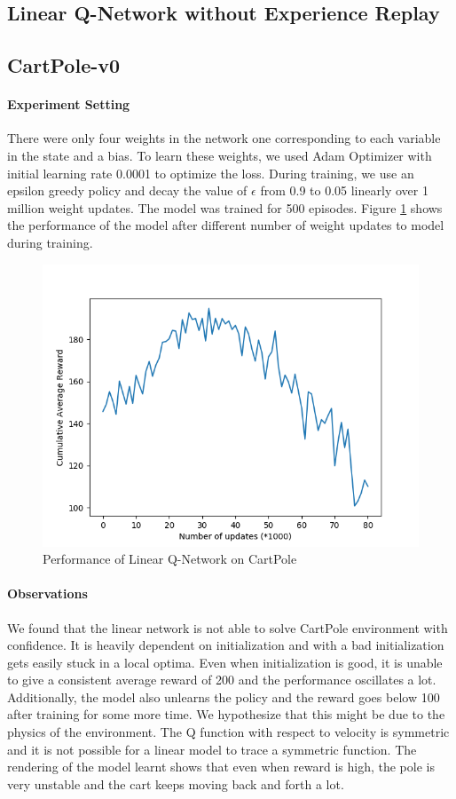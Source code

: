 \documentclass[12pt]{article}
\begin{document}
\pagebreak[4]

\subsection{Linear Q-Network without Experience Replay}
\subsection*{CartPole-v0}
\paragraph{Experiment Setting} There were only four weights in the network one corresponding to each variable in the state and a bias. To learn these weights, we used Adam Optimizer with initial learning rate 0.0001 to optimize the loss. During training, we use an epsilon greedy policy and decay the value of $\epsilon$ from 0.9 to 0.05 linearly over 1 million weight updates. The model was trained for 500 episodes. Figure \ref{fig:01} shows the performance of the model after different number of weight updates to model during training.
\begin{figure}[h]
  \centering
  \vspace{-5mm}
  \includegraphics[width=0.8\linewidth]{figures/reward_plot_01.png}
  \caption{Performance of Linear Q-Network on CartPole}
  \label{fig:01}
\end{figure}
\paragraph{Observations} We found that the linear network is not able to solve CartPole environment with confidence. It is heavily dependent on initialization and with a bad initialization gets easily stuck in a local optima. Even when initialization is good, it is unable to give a consistent average reward of 200 and the performance oscillates a lot. Additionally, the model also unlearns the policy and the reward goes below 100 after training for some more time. We hypothesize that this might be due to the physics of the environment. The Q function with respect to velocity is symmetric and it is not possible for a linear model to trace a symmetric function. The rendering of the model learnt shows that even when reward is high, the pole is very unstable and the cart keeps moving back and forth a lot.
\end{document}
